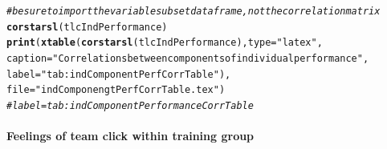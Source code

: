 \documentclass[english]{article}\usepackage[]{graphicx}\usepackage[]{color}
\makeatletter
\newcommand{\hlstr}[1]{\textcolor[rgb]{0.192,0.494,0.8}{#1}}%
\newcommand{\hlcom}[1]{\textcolor[rgb]{0.678,0.584,0.686}{\textit{#1}}}%
\newcommand{\hlstd}[1]{\textcolor[rgb]{0.345,0.345,0.345}{#1}}%
\newcommand{\hlkwc}[1]{\textcolor[rgb]{0.333,0.667,0.333}{#1}}%
\newcommand{\hlkwd}[1]{\textcolor[rgb]{0.737,0.353,0.396}{\textbf{#1}}}%
\newenvironment{kframe}{%
 \def\at@end@of@kframe{}%
 \ifinner\ifhmode%
  \def\at@end@of@kframe{\end{minipage}}%
  \begin{minipage}{\columnwidth}%
 \fi\fi%
 \def\FrameCommand##1{\hskip\@totalleftmargin \hskip-\fboxsep
 \colorbox{shadecolor}{##1}\hskip-\fboxsep
     \hskip-\linewidth \hskip-\@totalleftmargin \hskip\columnwidth}%
 \MakeFramed {\advance\hsize-\width
   \@totalleftmargin\z@ \linewidth\hsize
   \@setminipage}}%
 {\par\unskip\endMakeFramed%
 \at@end@of@kframe}
\newenvironment{knitrout}{}{} %
\newcommand{\myparagraph}[1]{\paragraph{#1}\mbox{}\\}
\makeatother
\begin{document}
\begin{knitrout}
\color{fgcolor}\begin{kframe}
\begin{alltt}
\hlcom{# be sure to import the variable subset data frame, not the correlation matrix}
\hlkwd{corstarsl}\hlstd{(tlcIndPerformance)}
\hlkwd{print}\hlstd{(}\hlkwd{xtable}\hlstd{(}\hlkwd{corstarsl}\hlstd{(tlcIndPerformance),} \hlkwc{type}\hlstd{=}\hlstr{"latex"}\hlstd{,}
                    \hlkwc{caption} \hlstd{=} \hlstr{"Correlations between components of individual performance"}\hlstd{,}
                    \hlkwc{label} \hlstd{=} \hlstr{"tab:indComponentPerfCorrTable"}\hlstd{),}
                    \hlkwc{file} \hlstd{=} \hlstr{"indComponengtPerfCorrTable.tex"}\hlstd{)}
\hlcom{# label = tab:indComponentPerformanceCorrTable}
\end{alltt}
\end{kframe}
\end{knitrout}








\myparagraph{Feelings of team click within training group}
\end{document}
